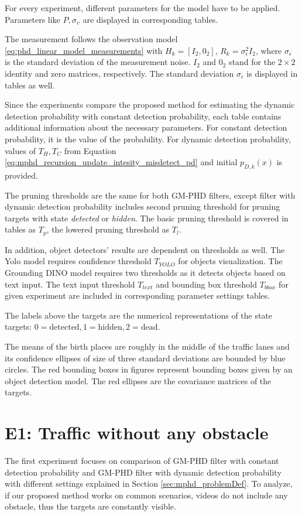 For every experiment, different parameters for the model have to be applied. Parameters like $P, \sigma_{\upsilon}$
are displayed in corresponding tables.

The measurement follows the observation model \eqref{eq:phd_linear_model_measurements} with $H_k = [I_2, 0_2]$, $R_k
= \sigma_{\epsilon}^2I_2$, where $ \sigma_{\epsilon}$ is the standard deviation of the measurement noise.  $I_2$ and $0_2$ stand for
the $2\times 2$ identity and zero matrices, respectively.
The standard deviation $\sigma_{\epsilon}$ is displayed in tables as well.

Since the experiments compare the proposed method for estimating the dynamic detection probability with constant
detection probability, each table contains additional information about the necessary parameters. For constant
detection probability, it is the value of the probability. For dynamic detection probability, values of $T_H, T_C$
from Equation \eqref{eq:mphd_recursion_update_intesity_misdetect_pd}
and initial $p_{D,k}(x)$ is provided.

The pruning thresholds are the same for both GM-PHD filters, except filter with dynamic detection probability
includes second pruning threshold for pruning targets with state \textit{detected} or \textit{hidden}. The basic
pruning threshold is covered in tables as $T_p$, the lowered pruning threshold as $T_l$.

In addition, object detectors' results are dependent on thresholds as well. The Yolo model requires confidence threshold $T_{YOLO}$ for objects visualization. The Grounding DINO model requires two thresholds as it detects objects based on text input. The text input threshold $T_{text}$ and bounding box threshold $T_{bbox}$ for given experiment are included in corresponding parameter settings tables.

The labels above
the targets are the numerical representations of the state targets: $0=\text{detected}, 1=\text{hidden}, 2=\text{dead}$.

The means of the birth places are roughly in the middle of the traffic lanes and its confidence ellipses of size of
three standard
deviations are bounded by blue circles. The red bounding boxes in figures represent bounding
boxes
given by an object detection model. The red ellipses are the covariance matrices of the targets.


\section{E1: Traffic without any obstacle}
The first experiment focuses on comparison of GM-PHD filter with constant detection probability and GM-PHD filter
with dynamic detection probability with different settings explained in Section \ref{sec:mphd_problemDef}. To analyze,
if our proposed method works on common scenarios, videos do not include any obstacle, thus the targets are
constantly visible.















